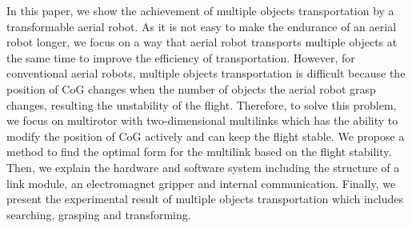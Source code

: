 In this paper, we show the achievement of multiple objects transportation by a transformable aerial robot. As it is not easy to make the endurance of an aerial robot longer, we focus on a way that aerial robot transports multiple objects at the same time to improve the efficiency of transportation. However, for conventional aerial robots, multiple objects transportation is difficult because the position of CoG changes when the number of objects the aerial robot grasp changes, resulting the unstability of the flight. Therefore, to solve this problem, we focus on multirotor with two-dimensional multilinks which has the ability to modify the position of CoG actively and can keep the flight stable. We propose a method to find the optimal form for the multilink based on the flight stability. Then, we explain the hardware and software system including the structure of a link module, an electromagnet gripper and internal communication. Finally, we present the experimental result of multiple objects transportation which includes searching, grasping and transforming.
